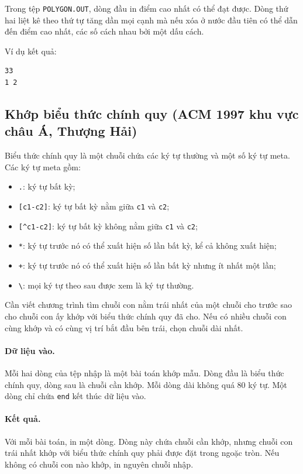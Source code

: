 \documentclass[11pt]{article}
\begin{document}
Trong tệp \texttt{POLYGON.OUT}, dòng đầu in điểm cao nhất có thể đạt được.
Dòng thứ hai liệt kê theo thứ tự tăng dần mọi cạnh mà nếu xóa ở nước đầu tiên
có thể dẫn đến điểm cao nhất, các số cách nhau bởi một dấu cách.

Ví dụ kết quả:
\begin{verbatim}
33
1 2
\end{verbatim}

\subsection{Khớp biểu thức chính quy (ACM 1997 khu vực châu Á, Thượng Hải)}

Biểu thức chính quy là một chuỗi chứa các ký tự thường và một số ký tự meta.
Các ký tự meta gồm:
\begin{itemize}
  \item \texttt{.}: ký tự bất kỳ;
  \item \texttt{[c1-c2]}: ký tự bất kỳ nằm giữa \texttt{c1} và \texttt{c2};
  \item \texttt{[\^{ }c1-c2]}: ký tự bất kỳ không nằm giữa \texttt{c1} và
  \texttt{c2};
  \item \texttt{*}: ký tự trước nó có thể xuất hiện số lần bất kỳ, kể cả
  không xuất hiện;
  \item \texttt{+}: ký tự trước nó có thể xuất hiện số lần bất kỳ nhưng ít
  nhất một lần;
  \item \texttt{\textbackslash}: mọi ký tự theo sau được xem là ký tự thường.
\end{itemize}

Cần viết chương trình tìm chuỗi con nằm trái nhất của một chuỗi cho trước sao
cho chuỗi con ấy khớp với biểu thức chính quy đã cho. Nếu có nhiều chuỗi con
cùng khớp và có cùng vị trí bắt đầu bên trái, chọn chuỗi dài nhất.

\paragraph{Dữ liệu vào.}
Mỗi hai dòng của tệp nhập là một bài toán khớp mẫu. Dòng đầu là biểu thức
chính quy, dòng sau là chuỗi cần khớp. Mỗi dòng dài không quá 80 ký tự. Một
dòng chỉ chứa \texttt{end} kết thúc dữ liệu vào.

\paragraph{Kết quả.}
Với mỗi bài toán, in một dòng. Dòng này chứa chuỗi cần khớp, nhưng chuỗi con
trái nhất khớp với biểu thức chính quy phải được đặt trong ngoặc tròn. Nếu
không có chuỗi con nào khớp, in nguyên chuỗi nhập.
\end{document}
